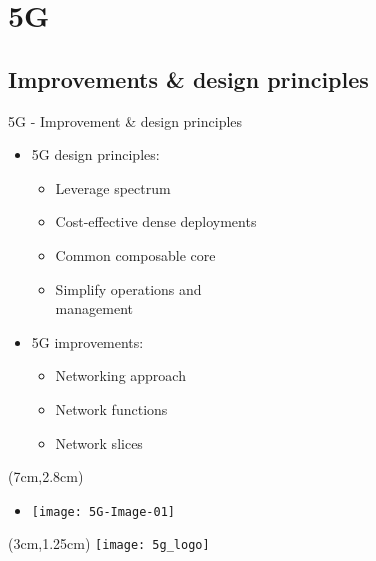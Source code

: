 \section{5G}
\subsection{Improvements \& design principles}
\begin{frame}{5G - Improvement \& design principles}

  \begin{itemize}
    \item[]<1-> 5G design principles:
      \begin{itemize}
      \item<2-> Leverage spectrum
      \item<3-> Cost-effective dense deployments
      \item<4-> Common composable core
      \item<5-> Simplify operations and \\ management
      \end{itemize}
  \end{itemize}

  \begin{itemize}
    \item[]<6-> 5G improvements:
      \begin{itemize}
      \item<7-> Networking approach
      \item<8-> Network functions
      \item<9-> Network slices
      \end{itemize}
  \end{itemize}

  \begin{textblock*}{5cm}(7cm,2.8cm)
    \begin{itemize}
      \item[]<9-> \texttt{[image: 5G-Image-01]}
    \end{itemize}
  \end{textblock*}

  \begin{textblock*}{5cm}(3cm,1.25cm)
    \texttt{[image: 5g\_logo]}
  \end{textblock*}
\end{frame}
